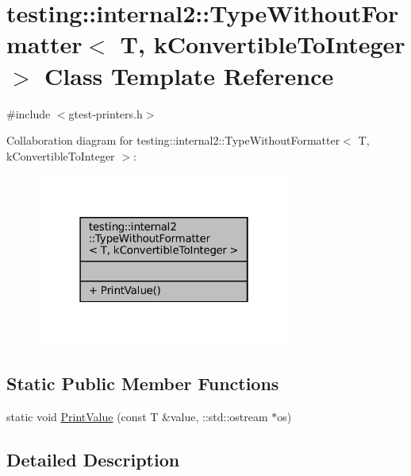 \hypertarget{classtesting_1_1internal2_1_1TypeWithoutFormatter_3_01T_00_01kConvertibleToInteger_01_4}{}\section{testing\+:\+:internal2\+:\+:Type\+Without\+Formatter$<$ T, k\+Convertible\+To\+Integer $>$ Class Template Reference}
\label{classtesting_1_1internal2_1_1TypeWithoutFormatter_3_01T_00_01kConvertibleToInteger_01_4}


{\ttfamily \#include $<$gtest-\/printers.\+h$>$}



Collaboration diagram for testing\+:\+:internal2\+:\+:Type\+Without\+Formatter$<$ T, k\+Convertible\+To\+Integer $>$\+:
\nopagebreak
\begin{figure}[H]
\begin{center}
\leavevmode
\includegraphics[width=238pt]{classtesting_1_1internal2_1_1TypeWithoutFormatter_3_01T_00_01kConvertibleToInteger_01_4__coll__graph}
\end{center}
\end{figure}
\subsection*{Static Public Member Functions}
\begin{DoxyCompactItemize}
\item 
static void \hyperlink{classtesting_1_1internal2_1_1TypeWithoutFormatter_3_01T_00_01kConvertibleToInteger_01_4_ab27a411afb608e730a57d232b3f4f486}{Print\+Value} (const T \&value, \+::std\+::ostream $\ast$os)
\end{DoxyCompactItemize}


\subsection{Detailed Description}

